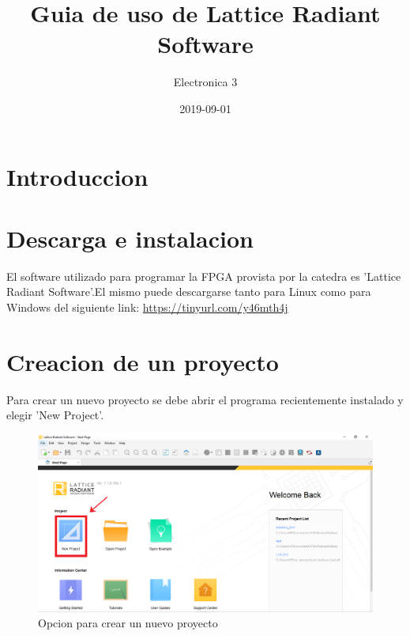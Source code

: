 \documentclass{article}
\title{Guia de uso de Lattice Radiant Software}
\date{2019-09-01}
\author{Electronica 3}
\begin{document}
\maketitle
{}
\newpage
{}

\section{Introduccion}

\section{Descarga e instalacion}
El software utilizado para programar la FPGA provista por la catedra es 'Lattice Radiant Software'.El mismo puede descargarse tanto para Linux como para Windows del siguiente link: \url{https://tinyurl.com/y46mth4j}

\section{Creacion de un proyecto}
	Para crear un nuevo proyecto se debe abrir el programa recientemente instalado y elegir 'New Project'.
	\begin{figure}[H]
	\includegraphics[width=\textwidth]{Imagenes/NewProj.png}
	\caption{Opcion para crear un nuevo proyecto}
	\end{figure}
	
\end{document}
